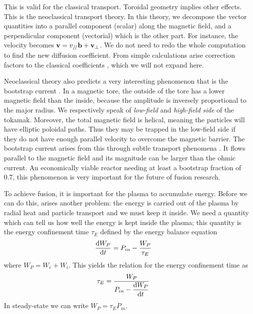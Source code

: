 This is valid for the classical transport. Toroidal geometry implies other effects. This is the neoclassical transport theory. In this theory, we decompose the vector quantities into a parallel component (scalar) along the magnetic field, and a perpendicular component (vectorial) which is the other part. For instance, the velocity becomes $\mathbf{v} = v_{/\!/} \mathbf{b} + \mathbf{v}_{\perp}$. We do not need to redo the whole computation to find the new diffusion coefficient. From simple calculations arise correction factors to the classical coefficients \cite{freidberg}, which we will not expand here.

Neoclassical theory also predicts a very interesting phenomenon that is the bootstrap current \cite{freidberg}. In a magnetic tore, the outside of the tore has a lower magnetic field than the inside, because the amplitude is inversely proportional to the major radius. We respectively speak of \emph{low-field} and \emph{high-field side} of the tokamak. Moreover, the total magnetic field is helical, meaning the particles will have elliptic poloidal paths. Thus they may be trapped in the low-field side if they do not have enough parallel velocity to overcome the magnetic barrier. The bootstrap current arises from this through subtle transport phenomena \cite{freidberg}. It flows parallel to the magnetic field and its magnitude can be larger than the ohmic current. An economically viable reactor needing at least a bootstrap fraction of 0.7, this phenomenon is very important for the future of fusion research.

To achieve fusion, it is important for the plasma to accumulate energy. Before we can do this, arises another problem: the energy is carried out of the plasma by radial heat and particle transport and we must keep it inside. We need a quantity which can tell us how well the energy is kept inside the plasma; this quantity is the energy confinement time $\tau_E$ defined by the energy balance equation \cite{itoh}
\begin{align}\label{eq:confinement:transport:tauE}
	\dfrac{\textrm{d} W_P}{\textrm{d} t} & = P_{in} - \dfrac{W_P}{\tau_E}
\end{align}
where $W_P = W_e + W_i$. This yields the relation for the energy confinement time as
\begin{align}
	\tau_E & = \dfrac{W_P}{P_{in} - \dfrac{\textrm{d} W_P}{\textrm{d} t}}
\end{align}
In steady-state we can write $W_P = \tau_E P_{in}$.

